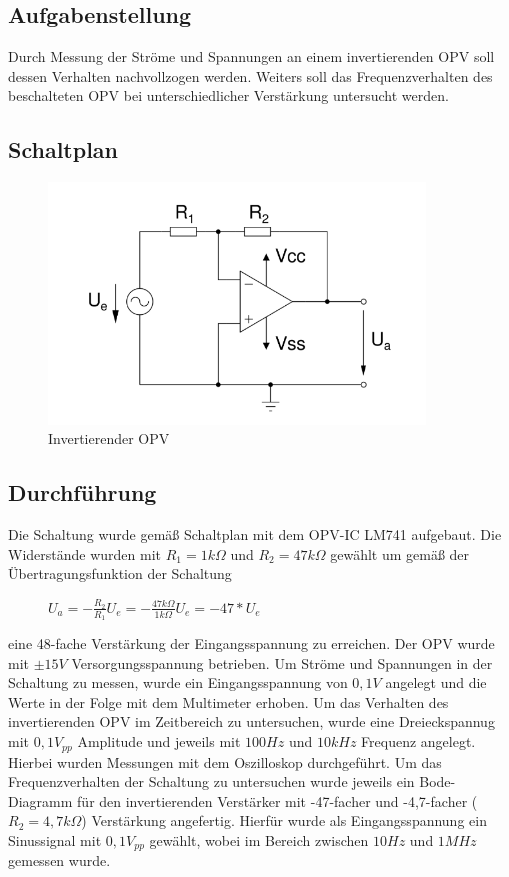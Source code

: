 \documentclass[12pt,a4paper,titlepage]{article}
\begin{document}
\subsection*{Aufgabenstellung}
Durch Messung der Ströme und Spannungen an einem invertierenden OPV soll dessen Verhalten nachvollzogen werden. Weiters soll das Frequenzverhalten des beschalteten OPV bei unterschiedlicher Verstärkung untersucht werden.

\subsection*{Schaltplan}
\begin{figure}[H]
  \centering
  \includegraphics[width=100mm]{i_opv_schaltung.png}
  \caption{Invertierender OPV}
\end{figure}

\subsection*{Durchf\"uhrung}
Die Schaltung wurde gemäß Schaltplan mit dem OPV-IC LM741 aufgebaut. Die Widerstände wurden mit $R_1 = 1k\Omega$ und $R_2 = 47k\Omega$ gewählt um gemäß der Übertragungsfunktion der Schaltung

\begin{figure}[H]
  \centering
  $U_a = -\frac{R_2}{R_1}U_e = -\frac{47k\Omega}{1k\Omega}U_e = -47*U_e$
\end{figure}

\noindent eine 48-fache Verstärkung der Eingangsspannung zu erreichen. Der OPV wurde mit $\pm 15V$ Versorgungsspannung betrieben. Um Ströme und Spannungen in der Schaltung zu messen, wurde ein Eingangsspannung von $0,1V$ angelegt und die Werte in der Folge mit dem Multimeter erhoben. Um das Verhalten des invertierenden OPV im Zeitbereich zu untersuchen, wurde eine Dreieckspannug mit $0,1V_{pp}$ Amplitude und jeweils mit $100Hz$ und $10kHz$ Frequenz angelegt. Hierbei wurden Messungen mit dem Oszilloskop durchgeführt. Um das Frequenzverhalten der Schaltung zu untersuchen wurde jeweils ein Bode-Diagramm für den invertierenden Verstärker mit -47-facher und -4,7-facher ($R_2=4,7k\Omega$) Verstärkung angefertig. Hierfür wurde als Eingangsspannung ein Sinussignal mit $0,1V_{pp}$ gewählt, wobei im Bereich zwischen $10Hz$ und $1MHz$ gemessen wurde.
\end{document}

